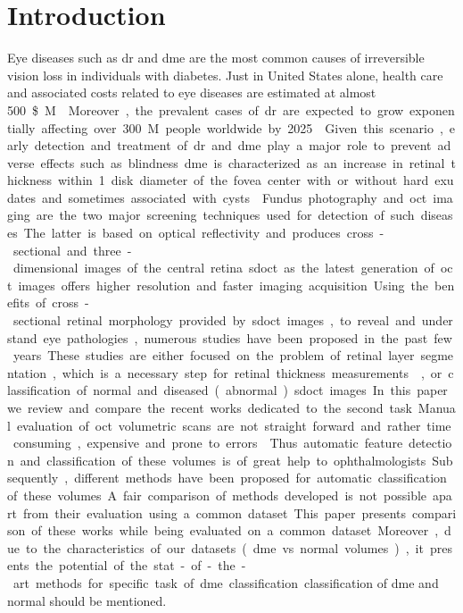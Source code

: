 \graphicspath{ {./content/intro/figures/} }

\section{Introduction}
\label{sec:intro}  %

Eye diseases such as \gls{dr} and \gls{dme} are the most common causes of irreversible vision loss in individuals with diabetes.  Just in United States alone, health care and associated costs related to eye diseases are estimated at almost \SI{500}\${M}~\cite{Sharma2005}.
Moreover, the prevalent cases of \gls{dr} are expected to grow exponentially affecting over \SI{300}{M} people worldwide by 2025~\cite{Wild2004}.
Given this scenario, early detection and treatment of \gls{dr} and \gls{dme} play a major role to prevent adverse effects such as blindness.
\gls{dme} is characterized as an increase in retinal thickness within 1 disk diameter of the fovea center with or without hard exudates and sometimes associated with cysts~\cite{ETDRSG1985}.

Fundus photography and \gls{oct} imaging are the two major screening techniques used for detection of such diseases.
The latter is based on optical reflectivity and produces cross-sectional and three-dimensional images of the central retina.
\gls{sdoct} as the latest generation of \gls{oct} images offers higher resolution and faster imaging acquisition. 
Using the benefits of cross-sectional retinal morphology provided by \gls{sdoct} images, to reveal and understand eye pathologies, numerous studies have been proposed in the past few years. 
These studies are either focused on the problem of retinal layer segmentation, which is a necessary step for retinal thickness measurements~\cite{Chiu2010,Kafieh2013}, or classification of normal and diseased (abnormal) \gls{sdoct} images.
In this paper we review and compare the recent works dedicated to the second task.

Manual evaluation of \gls{oct} volumetric scans are not straight forward and rather time consuming, expensive and prone to errors~\cite{Venhuizen2015}. 
Thus automatic feature detection and classification of these volumes is of great help to ophthalmologists. 
Subsequently, different methods have been proposed for automatic classification of these volumes. 
A fair comparison of methods developed is not possible apart from their evaluation using a common dataset. 
This paper presents comparison of these works while being evaluated on a common dataset.
Moreover, due to the characteristics of our datasets (\gls{dme} vs. normal volumes), it presents the potential of the stat-of-the-art methods for specific task of \gls{dme} classification.
{\color{red}classification of \gls{dme} and normal should be mentioned.}

